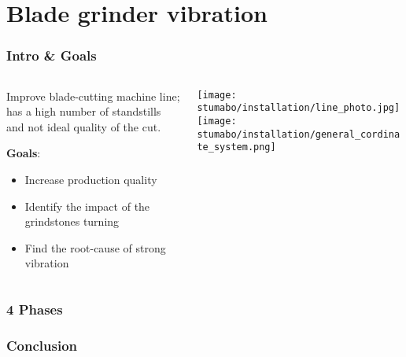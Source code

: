 \section{Blade grinder vibration}
\SectionPage

\begin{frame}
    \frametitle{Intro \& Goals}
    \vspace*{\fill}

    \begin{columns}[onlytextwidth, c]
        \begin{column}{.50\textwidth}
            Improve blade-cutting machine line; has a high number of standstills and not ideal quality of the cut.

            \textbf{Goals}:
            \begin{itemize}
                \item Increase production quality
                \item Identify the impact of the grindstones turning 
                \item Find the root-cause of strong vibration
            \end{itemize}
        \end{column}
        \begin{column}{.48\textwidth}
            \texttt{[image: stumabo/installation/line\_photo.jpg]}
            \texttt{[image: stumabo/installation/general\_cordinate\_system.png]}
        \end{column}
    \end{columns}
    \vspace*{\fill}
\end{frame}

\begin{frame}
    \frametitle{4 Phases}
    \vspace*{\fill}

    \vspace*{\fill}
\end{frame}

\begin{frame}
    \frametitle{Conclusion}
    \vspace*{\fill}

    \vspace*{\fill}
\end{frame}